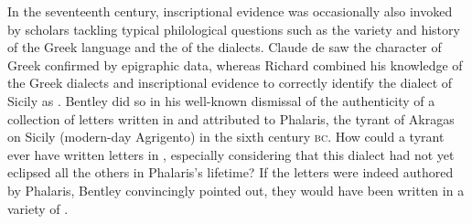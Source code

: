 In the seventeenth century, inscriptional evidence was occasionally also invoked by scholars tackling typical philological questions such as the variety and history of the Greek language and the  of the dialects. Claude de \citet[430]{Saumaise1643a} saw the  character of  Greek confirmed by epigraphic data, whereas Richard \citet[311]{Bentley1699} combined his knowledge of the Greek dialects and inscriptional evidence to correctly identify the dialect of Sicily as . Bentley did so in his well-known dismissal of the authenticity of a collection of letters written in  and attributed to Phalaris, the tyrant of Akragas on Sicily (modern-day Agrigento) in the sixth century \textsc{bc}. How could a  tyrant ever have written letters in , especially considering that this dialect had not yet eclipsed all the others in Phalaris’s lifetime? If the letters were indeed authored by Phalaris, Bentley convincingly pointed out, they would have been written in a variety of .

